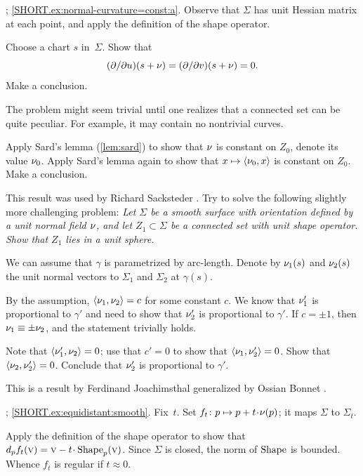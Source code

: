 \parbf{\ref{ex:normal-curvature=const}}; \ref{SHORT.ex:normal-curvature=const:a}.
Observe that $\Sigma$ has unit Hessian matrix at each point, and apply the definition of the shape operator.

Choose a chart $s$ in~$\Sigma$.
Show that
\[(\partial /\partial u)(s+\nu)
=
(\partial /\partial v)(s+\nu)
=
0.\]
Make a conclusion.

The problem might seem trivial until one realizes that a connected set can be quite peculiar.
For example, it may contain no nontrivial curves.

\medskip

Apply Sard's lemma (\ref{lem:sard}) to show that $\nu$ is constant on $Z_0$, denote its value $\nu_0$.
Apply Sard's lemma again to show that $x\mapsto \langle \nu_0,x\rangle$ is constant on $Z_0$.
Make a conclusion.

 This result was used by Richard Sacksteder \cite[Lemma 6]{sacksteder}.
Try to solve the following slightly more challenging problem:
\textit{Let $\Sigma$ be a smooth surface with orientation defined by a unit normal field $\nu$,
and let $Z_1\subset \Sigma$ be a connected set with unit shape operator.
Show that $Z_1$ lies in a unit sphere.}


We can assume that $\gamma$ is parametrized by arc-length.
Denote by $\nu_1(s)$ and $\nu_2(s)$ the unit normal vectors to $\Sigma_1$ and $\Sigma_2$ at $\gamma(s)$.

By the assumption, $\langle \nu_1,\nu_2\rangle= c$ for some constant $c$.
We know that
$\nu_1'$ is proportional to $\gamma'$ and need to show that $\nu_2'$ is proportional to $\gamma'$.
If $c=\pm1$, then $\nu_1\equiv\pm \nu_2$, and the statement trivially holds.

Note that $\langle\nu_1',\nu_2\rangle=0$;
use that $c'=0$ to show that $\langle\nu_1,\nu_2'\rangle=0$.
Show that $\langle\nu_2,\nu_2'\rangle=0$.
Conclude that $\nu_2'$ is proportional to $\gamma'$.

 This is a result by Ferdinand Joachimsthal \cite{joachimsthal} generalized by Ossian Bonnet \cite{bonnet}.

\parbf{\ref{ex:equidistant}};
\ref{SHORT.ex:equidistant:smooth}.
Fix~$t$.
Set $f_t\:p\mapsto p+t\cdot\Norm(p)$; it maps $\Sigma$ to $\Sigma_t$.

Apply the definition of the shape operator to show that $d_pf_t(\vec v)=\vec v-t\cdot\Shape_p(\vec v)$.
Since $\Sigma$ is closed, the norm of $\mathop{\rm Shape}\nolimits$ is bounded.
Whence $f_t$ is regular if $t\approx 0$.

